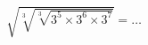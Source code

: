 \documentclass[preview]{standalone}
\begin{document}
\begin{align*}
\displaystyle \sqrt{\sqrt[3]{\sqrt[3]{3^5 \times 3^6 \times 3^7}}} =\dots
\end{align*}
\end{document}
